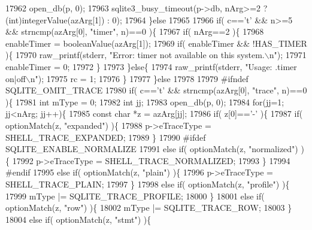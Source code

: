 \begin{DoxyCode}
{{{{{{{{{{{{{{{{{{{{{{{{{{{{{{{{{{{{{{{{{{{{{{{{{{{{{{{{{{{{{{{{{{{{{{{{{{{{{{{{{{{{{{{{{{{{{{{{{{{{{{{{{{{{{{{{{{{{{{{{{{{{{{{{{{{{{{{{{{{{{{{{{{{{17962     open_db(p, 0);
17963     sqlite3_busy_timeout(p->db, nArg>=2 ? (\textcolor{keywordtype}{int})integerValue(azArg[1]) : 0);
17964   \}\textcolor{keywordflow}{else}
17965 
17966   \textcolor{keywordflow}{if}( c==\textcolor{charliteral}{'t'} && n>=5 && strncmp(azArg[0], \textcolor{stringliteral}{"timer"}, n)==0 )\{
17967     \textcolor{keywordflow}{if}( nArg==2 )\{
17968       enableTimer = booleanValue(azArg[1]);
17969       \textcolor{keywordflow}{if}( enableTimer && !HAS_TIMER )\{
17970         raw_printf(stderr, \textcolor{stringliteral}{"Error: timer not available on this system.\(\backslash\)n"});
17971         enableTimer = 0;
17972       \}
17973     \}\textcolor{keywordflow}{else}\{
17974       raw_printf(stderr, \textcolor{stringliteral}{"Usage: .timer on|off\(\backslash\)n"});
17975       rc = 1;
17976     \}
17977   \}\textcolor{keywordflow}{else}
17978 
17979 \textcolor{preprocessor}{#ifndef SQLITE\_OMIT\_TRACE}
17980   \textcolor{keywordflow}{if}( c==\textcolor{charliteral}{'t'} && strncmp(azArg[0], \textcolor{stringliteral}{"trace"}, n)==0 )\{
17981     \textcolor{keywordtype}{int} mType = 0;
17982     \textcolor{keywordtype}{int} jj;
17983     open_db(p, 0);
17984     \textcolor{keywordflow}{for}(jj=1; jj<nArg; jj++)\{
17985       \textcolor{keyword}{const} \textcolor{keywordtype}{char} *z = azArg[jj];
17986       \textcolor{keywordflow}{if}( z[0]==\textcolor{charliteral}{'-'} )\{
17987         \textcolor{keywordflow}{if}( optionMatch(z, \textcolor{stringliteral}{"expanded"}) )\{
17988           p->eTraceType = SHELL_TRACE_EXPANDED;
17989         \}
17990 \textcolor{preprocessor}{#ifdef SQLITE\_ENABLE\_NORMALIZE}
17991         \textcolor{keywordflow}{else} \textcolor{keywordflow}{if}( optionMatch(z, \textcolor{stringliteral}{"normalized"}) )\{
17992           p->eTraceType = SHELL_TRACE_NORMALIZED;
17993         \}
17994 \textcolor{preprocessor}{#endif}
17995         \textcolor{keywordflow}{else} \textcolor{keywordflow}{if}( optionMatch(z, \textcolor{stringliteral}{"plain"}) )\{
17996           p->eTraceType = SHELL_TRACE_PLAIN;
17997         \}
17998         \textcolor{keywordflow}{else} \textcolor{keywordflow}{if}( optionMatch(z, \textcolor{stringliteral}{"profile"}) )\{
17999           mType |= SQLITE_TRACE_PROFILE;
18000         \}
18001         \textcolor{keywordflow}{else} \textcolor{keywordflow}{if}( optionMatch(z, \textcolor{stringliteral}{"row"}) )\{
18002           mType |= SQLITE_TRACE_ROW;
18003         \}
18004         \textcolor{keywordflow}{else} \textcolor{keywordflow}{if}( optionMatch(z, \textcolor{stringliteral}{"stmt"}) )\{
}}}}}}}}}}}}}}}}}}}}}}}}}}}}}}}}}}}}}}}}}}}}}}}}}}}}}}}}}}}}}}}}}}}}}}}}}}}}}}}}}}}}}}}}}}}}}}}}}}}}}}}}}}}}}}}}}}}}}}}}}}}}}}}}}}}}}}}}}}}}}}}}}}}}
\end{DoxyCode}
